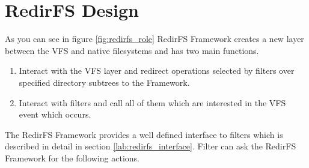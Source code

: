 \section{RedirFS Design}
As you can see in figure \ref{fig:redirfs_role} RedirFS Framework creates a new layer
between the VFS and native filesystems and has two main functions.

\begin{enumerate}
	\item Interact with the VFS layer and redirect operations selected by filters over
		specified directory subtrees to the Framework.
	\item Interact with filters and call all of them which are interested in
		the VFS event which occurs.
\end{enumerate}

The RedirFS Framework provides a well defined interface to filters which is 
described in detail in section \ref{lab:redirfs_interface}. Filter can ask the RedirFS Framework for
the following actions.


